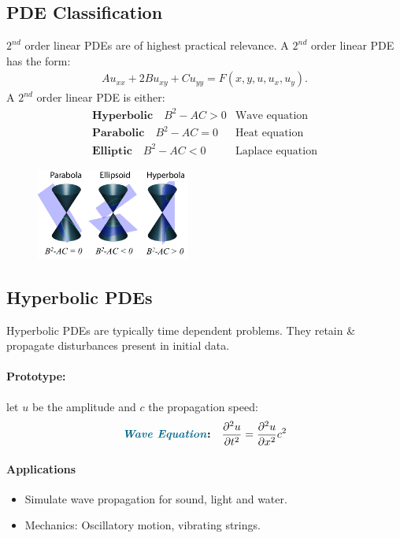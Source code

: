 \begin{multicols}{2}
\begin{description}
\end{description}

\subsection{PDE Classification}
$2^{nd}$ order linear PDEs are of highest practical relevance. A $2^{nd}$ order linear PDE has the form:
\begin{align*}
	Au_{xx} + 2Bu_{xy} + Cu_{yy} = F(x,y,u, u_x, u_y).
\end{align*}
A $2^{nd}$ order linear PDE is either:
\begin{align*}
	\textbf{Hyperbolic}\quad B^2-AC > 0 &\text{Wave equation}\\
	\textbf{Parabolic}\quad B^2-AC = 0 &\text{Heat equation}\\
	\textbf{Elliptic}\quad B^2-AC < 0 &\text{Laplace equation}
\end{align*}

\begin{figure}[H]
	\centering
	\includegraphics[width=0.45\textwidth]{img/03_PDE_classification}
\end{figure}

\subsection{Hyperbolic PDEs}
Hyperbolic PDEs are typically time dependent problems. They retain \& propagate disturbances present in initial data.
\paragraph{Prototype:} let $u$ be the amplitude and $c$ the propagation speed:
\begin{align*}
	\textbf{\emph{Wave Equation}:}\quad {\partial^2 u \over \partial t^2} = {\partial^2 u \over \partial x^2} c^2
\end{align*}
\paragraph{Applications}
\begin{itemize}
	\item Simulate wave propagation for sound, light and water.
	\item Mechanics: Oscillatory motion, vibrating strings.
\end{itemize}


\end{multicols}
